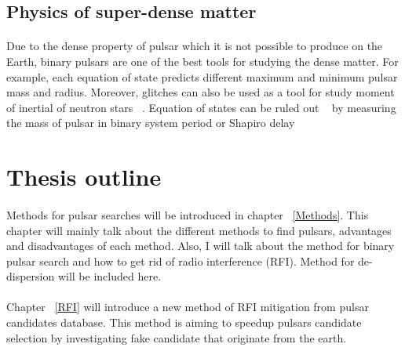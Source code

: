\documentclass[thesis_msc.tex]{subfiles}
\begin{document}
  
   \subsection{Physics of super-dense matter}
    \paragraph{} Due to the dense property of pulsar which it is not possible to produce on the Earth, binary pulsars are one of the best tools for studying the dense matter. For example, each equation of state predicts different maximum and minimum pulsar mass and radius. Moreover, glitches can also be used as a tool for study moment of inertial of neutron stars ~\citep{link1992pulsar}. Equation of states can be ruled out ~\citep{ozel2016masses} by measuring the mass of pulsar in binary system period or Shapiro delay  

\section{Thesis outline}
    \paragraph{} Methods for pulsar searches will be introduced in chapter ~\ref{Methods}. This chapter will mainly talk about the different methods to find pulsars, advantages and disadvantages of each method. Also, I will talk about the method for binary pulsar search and how to get rid of radio interference (RFI). Method for de-dispersion will be included here.
    \paragraph{} Chapter ~\ref{RFI} will introduce a new method of RFI mitigation from pulsar candidates database. This method is aiming to speedup pulsars candidate selection by investigating fake candidate that originate from the earth. 
\end{document}

